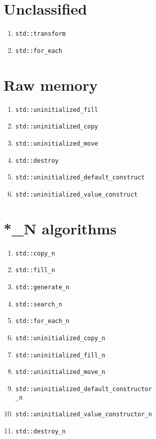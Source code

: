 \documentclass{article}
\begin{document}
\begin{multicols}{3}
\section{Unclassified}
\begin{enumerate}[resume]
\setlength\itemsep{0em}
\item \texttt{std::transform}
\item \texttt{std::for\_each}
\end{enumerate}

\section{Raw memory}
\begin{enumerate}[resume]
\setlength\itemsep{0em}
\item \texttt{std::uninitialized\_fill}
\item \texttt{std::uninitialized\_copy}
\item \texttt{std::uninitialized\_move}
\item \texttt{std::destroy}

\item \small{\texttt{std::uninitialized\_default\_construct}}
\item \texttt{std::uninitialized\_value\_construct}
\end{enumerate}

\section{*\_N algorithms}
\begin{enumerate}[resume]
\setlength\itemsep{0em}
\item \texttt{std::copy\_n}
\item \texttt{std::fill\_n}
\item \texttt{std::generate\_n}
\item \texttt{std::search\_n}
\item \texttt{std::for\_each\_n}
\item \texttt{std::uninitialized\_copy\_n}
\item \texttt{std::uninitialized\_fill\_n}
\item \texttt{std::uninitialized\_move\_n}
\item \small{\texttt{std::uninitialized\_default\_constructor\\\_n}}
\item \texttt{std::uninitialized\_value\_constructor\_n}
\item \texttt{std::destroy\_n}
\end{enumerate}
\end{multicols}
\end{document}
